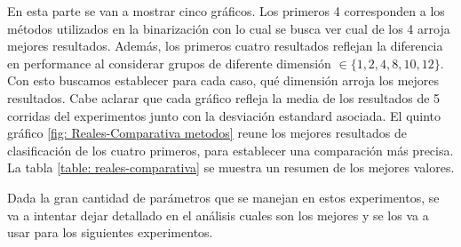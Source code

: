 	En esta parte se van a mostrar cinco gráficos. Los primeros 4 corresponden a los métodos utilizados en la binarización con lo cual se busca ver cual de los 4 arroja mejores resultados. Además, los primeros cuatro resultados reflejan la diferencia en performance al considerar grupos de diferente dimensión $\in \{ 1, 2, 4, 8, 10, 12\}$. Con esto buscamos establecer para cada caso, qué dimensión arroja los mejores resultados. Cabe aclarar que cada gráfico refleja la media de los resultados de 5 corridas del experimentos junto con la desviación estandard asociada. El quinto gráfico \ref{fig: Reales-Comparativa metodos} reune los mejores resultados de clasificación de los cuatro primeros, para establecer una comparación más precisa. La tabla \ref{table: reales-comparativa} se muestra un resumen de los mejores valores.
	
	 Dada la gran cantidad de parámetros que se manejan en estos experimentos, se va a intentar dejar detallado en el análisis cuales son los mejores y se los va a usar para los siguientes experimentos.
		
